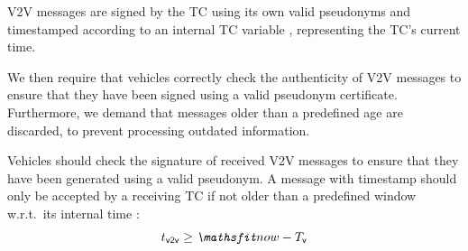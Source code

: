 \begin{req}
    \label{req:v2v-send}
    \ac{V2V} messages are signed by the \ac{TC} using its own valid pseudonyms
   and timestamped according to an internal \ac{TC} variable \funcnow{},
   representing the \ac{TC}'s current time.
\end{req}
We then require that vehicles correctly check the authenticity of \ac{V2V}
messages to ensure that they have been signed using a valid pseudonym
certificate. Furthermore, we demand that messages older than a predefined age
are discarded, to prevent processing outdated information.
%
\begin{req}
    \label{req:v2v-receive}
    Vehicles should check the signature of received \ac{V2V} messages to ensure
    that they have been generated using a valid pseudonym. A message with
    timestamp \paramtvv{} should only be accepted by a receiving \ac{TC} if not
    older than a predefined window \paramtt{} w.r.t.~its internal time
    \funcnow{}:
    \begin{equation}
        \label{eq:valid-v2v-generic}
        \paramtvv \geq \funcnow - \paramtt
    \end{equation}
\end{req}
%

